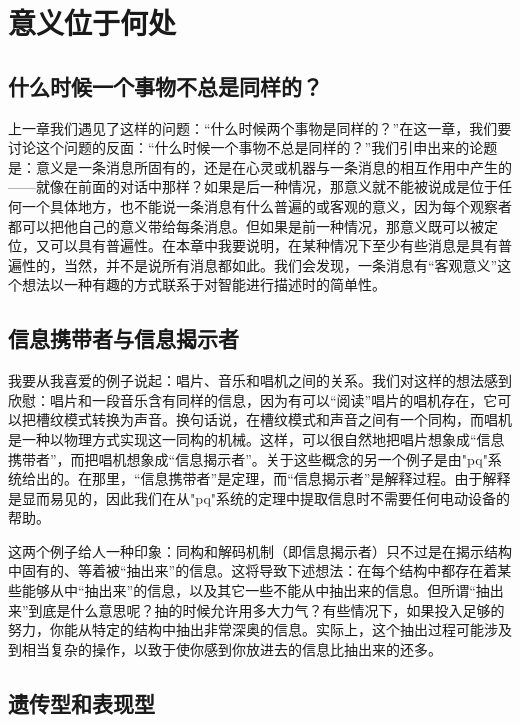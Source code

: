 
\chapter{意义位于何处}

\section{什么时候一个事物不总是同样的？}

上一章我们遇见了这样的问题：“什么时候两个事物是同样的？”在这一章，我们要讨论这个问题的反面：“什么时候一个事物不总是同样的？”我们引申出来的论题是：意义是一条消息所固有的，还是在心灵或机器与一条消息的相互作用中产生的——就像在前面的对话中那样？如果是后一种情况，那意义就不能被说成是位于任何一个具体地方，也不能说一条消息有什么普遍的或客观的意义，因为每个观察者都可以把他自己的意义带给每条消息。但如果是前一种情况，那意义既可以被定位，又可以具有普遍性。在本章中我要说明，在某种情况下至少有些消息是具有普遍性的，当然，并不是说所有消息都如此。我们会发现，一条消息有“客观意义”这个想法以一种有趣的方式联系于对智能进行描述时的简单性。

\section{信息携带者与信息揭示者}

我要从我喜爱的例子说起：唱片、音乐和唱机之间的关系。我们对这样的想法感到欣慰：唱片和一段音乐含有同样的信息，因为有可以“阅读”唱片的唱机存在，它可以把槽纹模式转换为声音。换句话说，在槽纹模式和声音之间有一个同构，而唱机是一种以物理方式实现这一同构的机械。这样，可以很自然地把唱片想象成“信息携带者”，而把唱机想象成“信息揭示者”。关于这些概念的另一个例子是由"pq"系统给出的。在那里，“信息携带者”是定理，而“信息揭示者”是解释过程。由于解释是显而易见的，因此我们在从"pq"系统的定理中提取信息时不需要任何电动设备的帮助。

这两个例子给人一种印象：同构和解码机制（即信息揭示者）只不过是在揭示结构中固有的、等着被“抽出来”的信息。这将导致下述想法：在每个结构中都存在着某些能够从中“抽出来”的信息，以及其它一些不能从中抽出来的信息。但所谓“抽出来”到底是什么意思呢？抽的时候允许用多大力气？有些情况下，如果投入足够的努力，你能从特定的结构中抽出非常深奥的信息。实际上，这个抽出过程可能涉及到相当复杂的操作，以致于使你感到你放进去的信息比抽出来的还多。

\section{遗传型和表现型}

